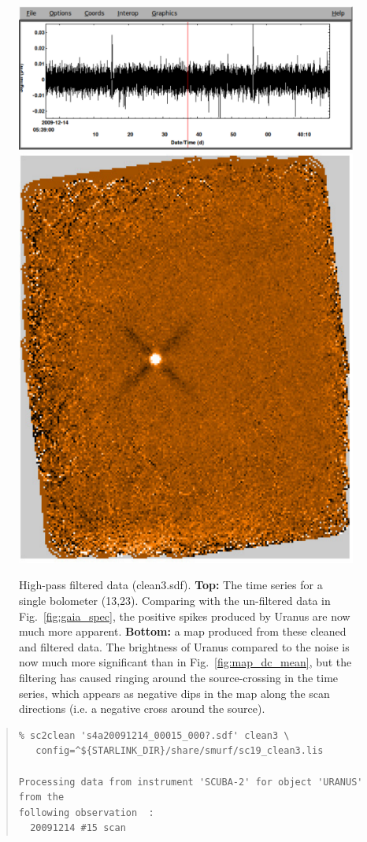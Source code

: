 \documentclass[twoside,11pt]{article}
\renewcommand{\_}{\texttt{\symbol{95}}}
\newenvironment{myquote}{\begin{quote}\begin{small}}{\end{small}\end{quote}}
\begin{document}
\begin{figure}
\begin{center}
\includegraphics[width=\linewidth]{sc19_spec_filt} \\
\vspace{0.3in}
\includegraphics[width=0.5\linewidth]{sc19_map_highpass}
\caption{High-pass filtered data (clean3.sdf). \textbf{Top:} The time
  series for a single bolometer (13,23). Comparing with the un-filtered
  data in Fig.~\ref{fig:gaia_spec}, the positive spikes produced by
  Uranus are now much more apparent. \textbf{Bottom:} a map produced from
  these cleaned and filtered data. The brightness of Uranus compared
  to the noise is now much more significant than in
  Fig.~\ref{fig:map_dc_mean}, but the filtering has caused ringing
  around the source-crossing in the time series, which appears as
  negative dips in the map along the scan directions (i.e. a negative
  cross around the source).}
\label{fig:highpass}
\end{center}
\end{figure}

\begin{myquote}
\begin{verbatim}
% sc2clean 's4a20091214_00015_000?.sdf' clean3 \
   config=^${STARLINK_DIR}/share/smurf/sc19_clean3.lis

Processing data from instrument 'SCUBA-2' for object 'URANUS' from the
following observation  :
  20091214 #15 scan

\end{verbatim}
\end{myquote}
\end{document}
